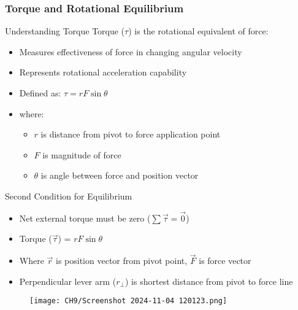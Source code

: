 \documentclass{beamer}
\begin{document}
\begin{frame}
\frametitle{Torque and Rotational Equilibrium}

\begin{block}{Understanding Torque}
Torque ($\tau$) is the rotational equivalent of force:
\begin{itemize}
    \item Measures effectiveness of force in changing angular velocity
    \item Represents rotational acceleration capability
    \item Defined as: $\tau = rF\sin\theta$
    \item where:
    \begin{itemize}
        \item $r$ is distance from pivot to force application point
        \item $F$ is magnitude of force
        \item $\theta$ is angle between force and position vector
    \end{itemize}
\end{itemize}
\end{block}
\end{frame}
\begin{frame}
\begin{block}{Second Condition for Equilibrium}
\begin{itemize}
    \item Net external torque must be zero ($\sum \vec{\tau} = \vec{0}$)
    \item Torque ($\vec{\tau}$) = $rF \sin \theta$
    \item Where $\vec{r}$ is position vector from pivot point, $\vec{F}$ is force vector
    \item Perpendicular lever arm ($r_\perp$) is shortest distance from pivot to force line
\end{itemize}
\end{block}

\begin{figure}
    \centering
    \texttt{[image: CH9/Screenshot 2024-11-04 120123.png]}
\end{figure}
\end{frame}
\end{document}
